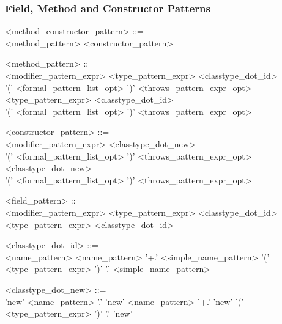 \subsubsection{Field, Method and Constructor Patterns}
\begin{minipage}{6in}
\begin{blue}
\begin{grammar}
<method_constructor_pattern> ::= \hspace{1in} \\
     <method_pattern>
\alt <constructor_pattern>

<method_pattern> ::= \hspace{1in} \\
     <modifier_pattern_expr> <type_pattern_expr> <classtype_dot_id> \\
     '(' <formal_pattern_list_opt> ')' <throws_pattern_expr_opt>
\alt <type_pattern_expr> <classtype_dot_id> \\
     '(' <formal_pattern_list_opt> ')' <throws_pattern_expr_opt>

<constructor_pattern> ::= \hspace{1in} \\
     <modifier_pattern_expr> <classtype_dot_new> \\
     '(' <formal_pattern_list_opt> ')' <throws_pattern_expr_opt>
\alt <classtype_dot_new> \\
     '(' <formal_pattern_list_opt> ')' <throws_pattern_expr_opt>

<field_pattern> ::= \hspace{1in} \\
     <modifier_pattern_expr> <type_pattern_expr> <classtype_dot_id>
\alt <type_pattern_expr> <classtype_dot_id>
\end{grammar}
\end{blue}
\end{minipage}


\begin{minipage}{6in}
\begin{blue}
\begin{grammar}
<classtype_dot_id> ::= \hspace{1in} \\
     <name_pattern>
\alt <name_pattern> '+.' <simple_name_pattern>
\alt '(' <type_pattern_expr> ')' '.' <simple_name_pattern>

<classtype_dot_new> ::= \hspace{1in} \\
    'new' 
\alt <name_pattern> '.' 'new'
\alt <name_pattern> '+.' 'new' 
\alt '(' <type_pattern_expr> ')' '.' 'new' 
\end{grammar}
\end{blue}
\end{minipage}


